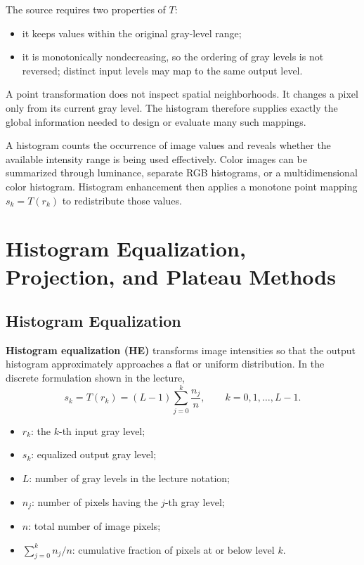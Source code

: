 \documentclass[11pt,a4paper,oneside]{report}
\newcommand{\mathlegend}[1]{%
  \par\vspace{0.2em}{\small\itshape where}\par
  \begin{itemize}[leftmargin=1.7em,topsep=0.15em,itemsep=0.12em]
  #1
  \end{itemize}
}
\begin{document}
The source requires two properties of $T$:
\begin{itemize}
  \item it keeps values within the original gray-level range;
  \item it is monotonically nondecreasing, so the ordering of gray levels is not reversed; distinct input levels may map to the same output level.
\end{itemize}

\begin{keyconcept}
A point transformation does not inspect spatial neighborhoods. It changes a pixel only from its current gray level. The histogram therefore supplies exactly the global information needed to design or evaluate many such mappings.
\end{keyconcept}

\FloatBarrier
\begin{chaptersummary}
A histogram counts the occurrence of image values and reveals whether the available intensity range is being used effectively. Color images can be summarized through luminance, separate RGB histograms, or a multidimensional color histogram. Histogram enhancement then applies a monotone point mapping $s_k=T(r_k)$ to redistribute those values.
\end{chaptersummary}

\chapter{Histogram Equalization, Projection, and Plateau Methods}

\section{Histogram Equalization}

\textbf{Histogram equalization (HE)} transforms image intensities so that the output histogram approximately approaches a flat or uniform distribution. In the discrete formulation shown in the lecture,
\begin{equation}
  s_k=T(r_k)=(L-1)\sum_{j=0}^{k}\frac{n_j}{n},
  \qquad k=0,1,\ldots,L-1.
  \label{eq:hist-equalization}
\end{equation}
\mathlegend{
  \item $r_k$: the $k$-th input gray level;
  \item $s_k$: equalized output gray level;
  \item $L$: number of gray levels in the lecture notation;
  \item $n_j$: number of pixels having the $j$-th gray level;
  \item $n$: total number of image pixels;
  \item $\sum_{j=0}^{k}n_j/n$: cumulative fraction of pixels at or below level $k$.
}
\end{document}
